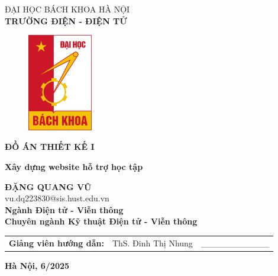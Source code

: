 \documentclass{article}
\begin{document}
	
	\thispagestyle{empty}
	\begin{center}
		\vspace{-12pt}  \fontsize{14pt}{0pt}\selectfont ĐẠI HỌC BÁCH KHOA HÀ NỘI \\[6pt]
		\textbf{\fontsize{16pt}{0pt}\selectfont TRƯỜNG ĐIỆN - ĐIỆN TỬ}
		\vspace{1.75cm}
		\begin{figure}[H]
			\centering
			\includegraphics[height=4.25cm]{logoHUST.png}
		\end{figure}
		\vspace{1cm}
		\textbf{\fontsize{25pt}{0pt}\selectfont ĐỒ ÁN THIẾT KẾ I} 
		\vspace{0.5cm}
	\end{center}
	\begin{center}
		\textbf{\fontsize{22pt}{0pt}\selectfont Xây dựng website hỗ trợ học tập} \\
		\vspace{2.5cm}
		
		\textbf{\fontsize{18pt}{0pt}\selectfont ĐẶNG QUANG VŨ} \\[6pt]
		\fontsize{16pt}{0pt}\selectfont vu.dq223830@sis.hust.edu.vn \\[6pt]
		\vspace{0.75cm}
		\textbf{\fontsize{16pt}{0pt}\selectfont Ngành Điện tử - Viễn thông} \\[6pt]
		\textbf{\fontsize{16pt}{0pt}\selectfont Chuyên ngành Kỹ thuật Điện tử - Viễn thông} 
		\vspace{0.75cm}
		\begin{table}[H]
			\centering
			\begin{tabular}{l l l}
				\fontsize{16pt}{0pt}\selectfont \textbf{Giảng viên hướng dẫn:}    & \fontsize{16pt}{0pt}\selectfont ThS. Đinh Thị Nhung \vspace{6pt} & \_\_\_\_\_\_\_\_\_\_\_ \\ 
			\end{tabular}
		\end{table}
		\vspace{2.5cm}
		\fontsize{14pt}{0pt}\selectfont \textbf{Hà Nội, 6/2025}
	\end{center}
\end{document}

